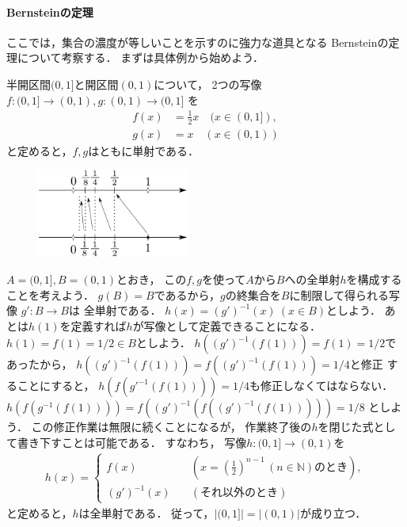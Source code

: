   \paragraph{Bernsteinの定理}
   ここでは，集合の濃度が等しいことを示すのに強力な道具となる
   Bernsteinの定理について考察する．
   まずは具体例から始めよう．
   \begin{ex} \label{ex:heikaiBern}
     半開区間$(0,1]$と開区間$(0,1)$について，
     2つの写像$f:(0,1] \longrightarrow (0,1), g: (0,1) \longrightarrow (0,1]$
     を
     \begin{align*}
       f(x) & = \frac{1}{2} x \quad ( x \in (0,1] ) , \\
       g(x) & = x \quad  (x \in (0,1) )
     \end{align*}
     と定めると，$f, g$はともに単射である．
     \begin{figure}[htbp]
       \centering
       \includegraphics[width=5cm]{inputyou/cardinal//picture/heikaicard.pdf}
     \end{figure}

     $A= (0,1], B= (0,1)$とおき，
     この$f,g$を使って$A$から$B$への全単射$h$を構成することを考えよう．
     $g(B) = B$であるから，$g$の終集合を$B$に制限して得られる写像
     $g' : B \longrightarrow B$は
     全単射である．
     $h(x) = (g')^{-1} (x) \ (x \in B)$としよう．
     あとは$h(1)$を定義すれば$h$が写像として定義できることになる．
     $h(1) = f(1)=1/2 \in B$としよう．
     $h((g')^{-1}(f(1))) = f(1) = 1/2$であったから，
     $h((g')^{-1}(f(1))) = f((g')^{-1}(f(1)))= 1/4$と修正
     することにすると，
     $h(f(g'^{-1}(f(1))))=1/4$も修正しなくてはならない．
     $h(f(g^{-1}(f(1)))) = f((g')^{-1}(f((g')^{-1}(f(1)))))=1/8$
     としよう．
     この修正作業は無限に続くことになるが，
     作業終了後の$h$を閉じた式として書き下すことは可能である．
     すなわち，
     写像$h: (0,1] \longrightarrow (0,1)$を
     \begin{align*}
       h(x) = \left \{ 
         \begin{aligned}
           f(x) \qquad & \left( x= 
           \left( \frac{1}{2} \right) ^{n-1} \, ( n \in \mathbb{N} ) \text{のとき} \right) , \\
           (g')^{-1}(x) \quad & ( \text{それ以外のとき} ) 
         \end{aligned}
         \right.
     \end{align*}
     と定めると，$h$は全単射である．
     従って，$\big \lvert (0,1] \big \rvert 
     = \big \lvert (0,1) \big \rvert $が成り立つ．
   \end{ex}

